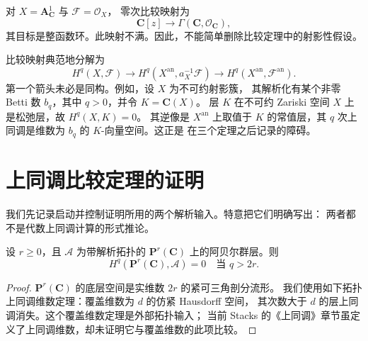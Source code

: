 \begin{remark}[射影性不可缺少]
\label{remark-gaga-projectivity-essential}
对 $X=\mathbf A^1_{\mathbf C}$ 与 $\mathcal F=\mathcal O_X$，
零次比较映射为
$$
\mathbf C[z]\longrightarrow
\Gamma(\mathbf C,\mathcal O_{\mathbf C}),
$$
其目标是整函数环。此映射不满。因此，不能简单删除比较定理中的射影性假设。
\end{remark}

\begin{remark}[中间逆像层]
\label{remark-gaga-comparison-factorization}
比较映射典范地分解为
$$
H^q(X,\mathcal F)
\longrightarrow H^q(X^{\mathrm{an}},a_X^{-1}\mathcal F)
\longrightarrow H^q(X^{\mathrm{an}},\mathcal F^{\mathrm{an}}).
$$
第一个箭头未必是同构。例如，设 $X$ 为不可约射影簇，
其解析化有某个非零 Betti 数 $b_q$，其中 $q>0$，并令 $K=\mathbf C(X)$。
层 $K$ 在不可约 Zariski 空间 $X$ 上是松弛层，故 $H^q(X,K)=0$。
其逆像是 $X^{\mathrm{an}}$ 上取值于 $K$ 的常值层，其 $q$ 次上同调是维数为
$b_q$ 的 $K$-向量空间。这正是 \cite[\S 3，第 12 号]{GAGA}
在三个定理之后记录的障碍。
\end{remark}


\section{上同调比较定理的证明}
\label{section-proof-gaga-cohomology}

我们先记录启动并控制证明所用的两个解析输入。特意把它们明确写出：
两者都不是代数上同调计算的形式推论。

\begin{lemma}[射影空间的解析上同调维数]
\label{lemma-projective-analytic-cohomological-dimension}
设 $r \geq 0$，且 $\mathcal A$ 为带解析拓扑的
$\mathbf P^r(\mathbf C)$ 上的阿贝尔群层。则
$$
H^q(\mathbf P^r(\mathbf C),\mathcal A)=0
\quad\text{当 }q>2r.
$$
\end{lemma}

\begin{proof}
$\mathbf P^r(\mathbf C)$ 的底层空间是实维数 $2r$ 的紧可三角剖分流形。
我们使用如下拓扑上同调维数定理：覆盖维数为 $d$ 的仿紧 Hausdorff 空间，
其次数大于 $d$ 的层上同调消失。这个覆盖维数定理是外部拓扑输入；
当前 Stacks 的《上同调》章节虽定义了上同调维数，却未证明它与覆盖维数的此项比较。
\end{proof}

